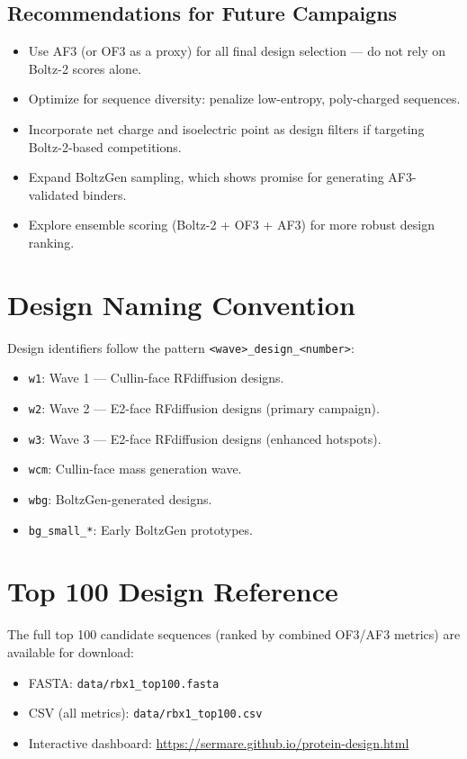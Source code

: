 \documentclass[11pt,a4paper]{article}
\begin{document}
\subsection{Recommendations for Future Campaigns}

\begin{itemize}
  \item Use AF3 (or OF3 as a proxy) for all final design selection --- do not rely on Boltz-2 scores alone.
  \item Optimize for sequence diversity: penalize low-entropy, poly-charged sequences.
  \item Incorporate net charge and isoelectric point as design filters if targeting Boltz-2-based competitions.
  \item Expand BoltzGen sampling, which shows promise for generating AF3-validated binders.
  \item Explore ensemble scoring (Boltz-2 + OF3 + AF3) for more robust design ranking.
\end{itemize}

\appendix
\section{Design Naming Convention}

Design identifiers follow the pattern \texttt{<wave>\_design\_<number>}:

\begin{itemize}
  \item \texttt{w1}: Wave 1 --- Cullin-face RFdiffusion designs.
  \item \texttt{w2}: Wave 2 --- E2-face RFdiffusion designs (primary campaign).
  \item \texttt{w3}: Wave 3 --- E2-face RFdiffusion designs (enhanced hotspots).
  \item \texttt{wcm}: Cullin-face mass generation wave.
  \item \texttt{wbg}: BoltzGen-generated designs.
  \item \texttt{bg\_small\_*}: Early BoltzGen prototypes.
\end{itemize}

\section{Top 100 Design Reference}

The full top 100 candidate sequences (ranked by combined OF3/AF3 metrics) are available for download:

\begin{itemize}
  \item FASTA: \texttt{data/rbx1\_top100.fasta}
  \item CSV (all metrics): \texttt{data/rbx1\_top100.csv}
  \item Interactive dashboard: \url{https://sermare.github.io/protein-design.html}
\end{itemize}
\end{document}

